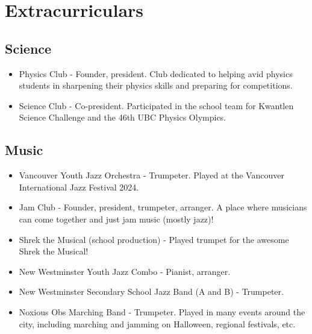 \documentclass{article}
\begin{document}
\section*{Extracurriculars}

\subsection*{Science}

\begin{itemize}
    \item Physics Club - Founder, president. Club dedicated to helping avid physics students in sharpening their physics skills and preparing for competitions.
    \item Science Club - Co-president. Participated in the school team for Kwantlen Science Challenge and the 46th UBC Physics Olympics.
\end{itemize}

\subsection*{Music}

\begin{itemize}
    \item Vancouver Youth Jazz Orchestra - Trumpeter. Played at the Vancouver International Jazz Festival 2024.
    \item Jam Club - Founder, president, trumpeter, arranger. A place where musicians can come together and just jam music (mostly jazz)!
    \item Shrek the Musical (school production) - Played trumpet for the awesome Shrek the Musical!
    \item New Westminster Youth Jazz Combo - Pianist, arranger.
    \item New Westminster Secondary School Jazz Band (A and B) - Trumpeter.
    \item Noxious Obs Marching Band - Trumpeter. Played in many events around the city, including marching and jamming on Halloween, regional festivals, etc.
\end{itemize}
\end{document}
